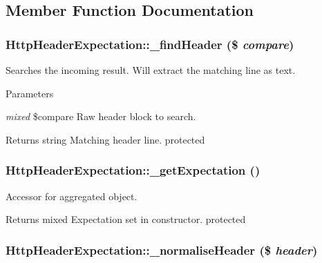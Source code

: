 \subsection{Member Function Documentation}
\hypertarget{class_http_header_expectation_a8ddd193f67f36b80517dcd00c0c0a2c2}{
\subsubsection[{\_\-findHeader}]{\setlength{\rightskip}{0pt plus 5cm}HttpHeaderExpectation::\_\-findHeader (\$ {\em compare})}}
\label{class_http_header_expectation_a8ddd193f67f36b80517dcd00c0c0a2c2}
Searches the incoming result. Will extract the matching line as text. 
\begin{DoxyParams}{Parameters}
\item[{\em mixed}]\$compare Raw header block to search. \end{DoxyParams}
\begin{DoxyReturn}{Returns}
string Matching header line.  protected 
\end{DoxyReturn}
\hypertarget{class_http_header_expectation_ac77ecb228256b46964c46a7dfcbeb030}{
\subsubsection[{\_\-getExpectation}]{\setlength{\rightskip}{0pt plus 5cm}HttpHeaderExpectation::\_\-getExpectation ()}}
\label{class_http_header_expectation_ac77ecb228256b46964c46a7dfcbeb030}
Accessor for aggregated object. \begin{DoxyReturn}{Returns}
mixed Expectation set in constructor.  protected 
\end{DoxyReturn}
\hypertarget{class_http_header_expectation_a45f30ccc9cec011cd55f3bed48f45807}{
\subsubsection[{\_\-normaliseHeader}]{\setlength{\rightskip}{0pt plus 5cm}HttpHeaderExpectation::\_\-normaliseHeader (\$ {\em header})}}
